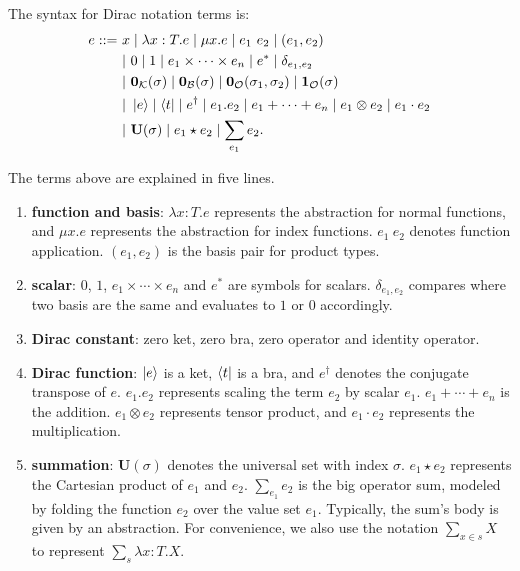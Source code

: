 \begin{definition}
    The syntax for Dirac notation terms is:
    \begin{align*}
        e ::=\ & x \mid \lambda x : T.e \mid \mu x.e \mid e_1\ e_2 \mid (e_1, e_2) \\
        & |\ 0 \mid 1 \mid e_1 \times \cdots \times e_n \mid e^* \mid \delta_{e_1, e_2} \\
        & |\ \mathbf{0}_\mathcal{K}(\sigma) \mid \mathbf{0}_\mathcal{B}(\sigma) \mid \mathbf{0}_\mathcal{O}(\sigma_1, \sigma_2) \mid \mathbf{1}_\mathcal{O}(\sigma) \\
        & |\ \ket{e} \mid \bra{t} \mid e^\dagger \mid e_1.e_2 \mid e_1 + \cdots + e_n \mid e_1 \otimes e_2 \mid e_1 \cdot e_2 \\
        & |\ \mathbf{U}(\sigma) \mid e_1 \star e_2 \mid \sum_{e_1} e_2.
    \end{align*}
\end{definition}
The terms above are explained in five lines.
\begin{enumerate}
    \item \textbf{function and basis}: \( \lambda x : T.e \) represents the abstraction for normal functions, and \( \mu x.e \) represents the abstraction for index functions.
    \( e_1\ e_2 \) denotes function application.
    \( (e_1, e_2) \) is the basis pair for product types.
    \item \textbf{scalar}: \( 0 \), \( 1 \), \( e_1 \times \cdots \times e_n \) and \( e^* \) are symbols for scalars.
    \( \delta_{e_1, e_2} \) compares where two basis are the same and evaluates to $1$ or $0$ accordingly.
    \item \textbf{Dirac constant}: zero ket, zero bra, zero operator and identity operator.
    \item \textbf{Dirac function}: \( \ket{e} \) is a ket, \( \bra{t} \) is a bra, and \( e^\dagger \) denotes the conjugate transpose of \( e \). \( e_1.e_2 \) represents scaling the term \( e_2 \) by scalar \( e_1 \). \(e_1 + \cdots + e_n\) is the addition. \( e_1 \otimes e_2 \) represents tensor product, and \( e_1 \cdot e_2 \) represents the multiplication.
    \item \textbf{summation}: \( \mathbf{U}(\sigma) \) denotes the universal set with index \( \sigma \). \( e_1 \star e_2 \) represents the Cartesian product of \( e_1 \) and \( e_2 \). \( \sum_{e_1} e_2 \) is the big operator sum, modeled by folding the function \( e_2 \) over the value set \( e_1 \). Typically, the sum's body is given by an abstraction. For convenience, we also use the notation \( \sum_{x \in s} X \) to represent \( \sum_{s} \lambda x : T . X \).
\end{enumerate}

